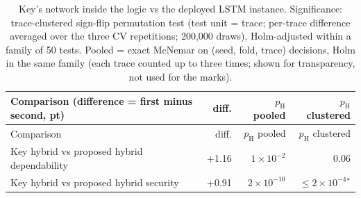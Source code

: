 \begin{longtable}{@{}p{8.6cm}rrr@{}}
\caption{Key's network inside the logic vs the deployed LSTM instance. Significance: trace-clustered sign-flip permutation test (test unit = trace; per-trace difference averaged over the three CV repetitions; 200{,}000 draws), Holm-adjusted within a family of 50 tests. Pooled = exact McNemar on (seed, fold, trace) decisions, Holm in the same family (each trace counted up to three times; shown for transparency, not used for the marks).}\label{tab:S7}\\
\toprule Comparison (difference = first minus second, pt) & diff. & $p_{\mathrm{H}}$ pooled & $p_{\mathrm{H}}$ clustered \\ \midrule \endfirsthead
\toprule Comparison & diff. & $p_{\mathrm{H}}$ pooled & $p_{\mathrm{H}}$ clustered \\ \midrule \endhead
Key hybrid vs proposed hybrid dependability & +1.16 & $1\times10^{-2}$ & 0.06 \\
Key hybrid vs proposed hybrid security & +0.91 & $2\times10^{-10}$ & $\le 2\times10^{-4}$$^{*}$ \\
\bottomrule
\end{longtable}